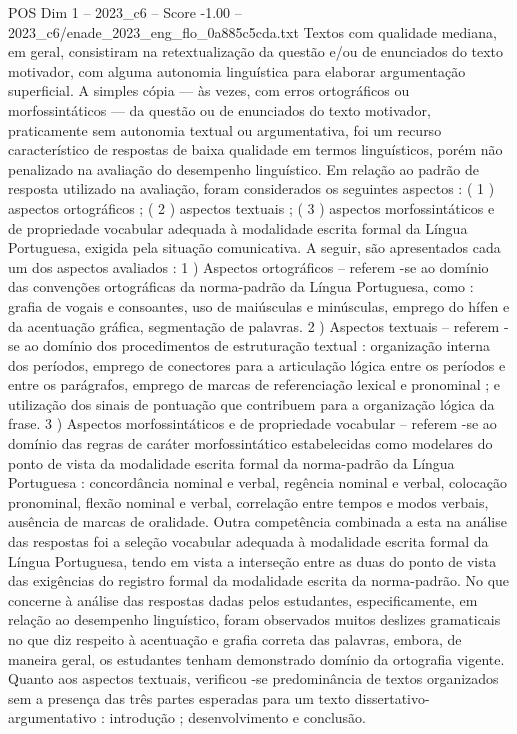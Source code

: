 \begin{textsample}{POS Dim 1 – 2023\_c6 – Score -1.00 – 2023\_c6/enade\_2023\_eng\_flo\_0a885c5cda.txt}
Textos com qualidade mediana, em geral, consistiram na retextualização da questão e/ou de enunciados do texto motivador, com alguma autonomia linguística para elaborar argumentação superficial.
A simples cópia — às vezes, com erros ortográficos ou morfossintáticos — da questão ou de enunciados do texto motivador, praticamente sem autonomia textual ou argumentativa, foi um recurso característico de respostas de baixa qualidade em termos linguísticos, porém não penalizado na avaliação do desempenho linguístico.
Em relação ao padrão de resposta utilizado na avaliação, foram considerados os seguintes aspectos : ( 1 ) aspectos ortográficos ; ( 2 ) aspectos textuais ; ( 3 ) aspectos morfossintáticos e de propriedade vocabular adequada à modalidade escrita formal da Língua Portuguesa, exigida pela situação comunicativa.
A seguir, são apresentados cada um dos aspectos avaliados : 1 ) Aspectos ortográficos – referem -se ao domínio das convenções ortográficas da norma-padrão da Língua Portuguesa, como : grafia de vogais e consoantes, uso de maiúsculas e minúsculas, emprego do hífen e da acentuação gráfica, segmentação de palavras. 2 ) Aspectos textuais – referem -se ao domínio dos procedimentos de estruturação textual : organização interna dos períodos, emprego de conectores para a articulação lógica entre os períodos e entre os parágrafos, emprego de marcas de referenciação lexical e pronominal ; e utilização dos sinais de pontuação que contribuem para a organização lógica da frase. 3 ) Aspectos morfossintáticos e de propriedade vocabular – referem -se ao domínio das regras de caráter morfossintático estabelecidas como modelares do ponto de vista da modalidade escrita formal da norma-padrão da Língua Portuguesa : concordância nominal e verbal, regência nominal e verbal, colocação pronominal, flexão nominal e verbal, correlação entre tempos e modos verbais, ausência de marcas de oralidade.
Outra competência combinada a esta na análise das respostas foi a seleção vocabular adequada à modalidade escrita formal da Língua Portuguesa, tendo em vista a interseção entre as duas do ponto de vista das exigências do registro formal da modalidade escrita da norma-padrão.
No que concerne à análise das respostas dadas pelos estudantes, especificamente, em relação ao desempenho linguístico, foram observados muitos deslizes gramaticais no que diz respeito à acentuação e grafia correta das palavras, embora, de maneira geral, os estudantes tenham demonstrado domínio da ortografia vigente.
Quanto aos aspectos textuais, verificou -se predominância de textos organizados sem a presença das três partes esperadas para um texto dissertativo-argumentativo : introdução ; desenvolvimento e conclusão.

\end{textsample}
